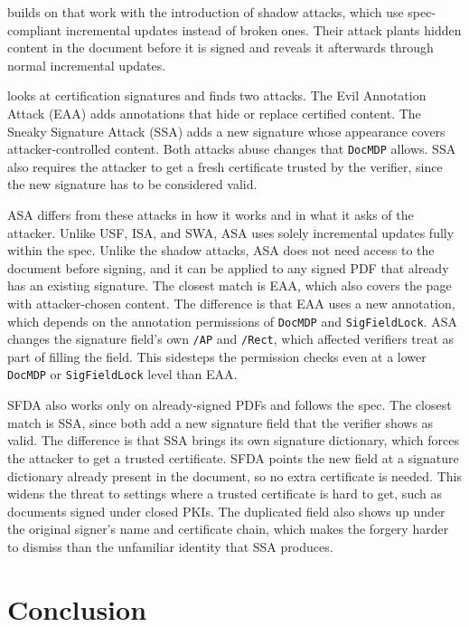 \documentclass[12pt]{article}
\begin{document}
\cite{shadow-attacks} builds on that work with the introduction of shadow attacks, which use spec-compliant incremental updates instead of broken ones. Their attack plants hidden content in the document before it is signed and reveals it afterwards through normal incremental updates.

\cite{pdf-certification-attack} looks at certification signatures and finds two attacks. The Evil Annotation Attack (EAA) adds annotations that hide or replace certified content. The Sneaky Signature Attack (SSA) adds a new signature whose appearance covers attacker-controlled content. Both attacks abuse changes that \texttt{DocMDP} allows. SSA also requires the attacker to get a fresh certificate trusted by the verifier, since the new signature has to be considered valid.

ASA differs from these attacks in how it works and in what it asks of the attacker. Unlike USF, ISA, and SWA, ASA uses solely incremental updates fully within the spec. Unlike the shadow attacks, ASA does not need access to the document before signing, and it can be applied to any signed PDF that already has an existing signature. The closest match is EAA, which also covers the page with attacker-chosen content. The difference is that EAA uses a new annotation, which depends on the annotation permissions of \texttt{DocMDP} and \texttt{SigFieldLock}. ASA changes the signature field's own \texttt{/AP} and \texttt{/Rect}, which affected verifiers treat as part of filling the field. This sidesteps the permission checks even at a lower \texttt{DocMDP} or \texttt{SigFieldLock} level than EAA.

SFDA also works only on already-signed PDFs and follows the spec. The closest match is SSA, since both add a new signature field that the verifier shows as valid. The difference is that SSA brings its own signature dictionary, which forces the attacker to get a trusted certificate. SFDA points the new field at a signature dictionary already present in the document, so no extra certificate is needed. This widens the threat to settings where a trusted certificate is hard to get, such as documents signed under closed PKIs. The duplicated field also shows up under the original signer's name and certificate chain, which makes the forgery harder to dismiss than the unfamiliar identity that SSA produces.

\section{Conclusion}
\end{document}

